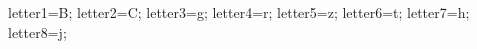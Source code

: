 \documentclass[exercice]{thedocument}%
\begin{document}
%
\>letter1=B;%
\>letter2=C;%
\>letter3=g;%
\>letter4=r;%
\>letter5=z;%
\>letter6=t;%
\>letter7=h;%
\>letter8=j;%
%
\end{document}
